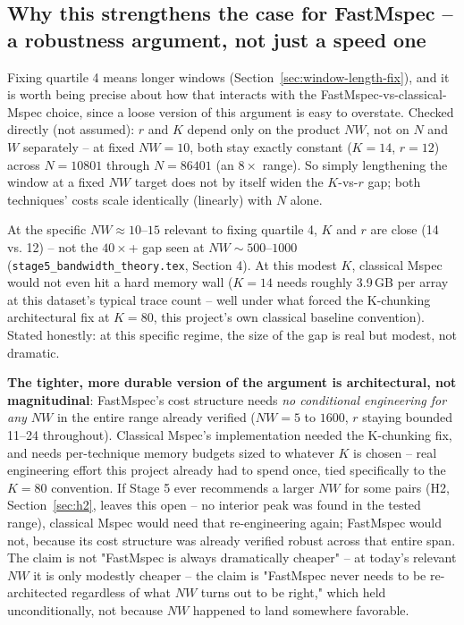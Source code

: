 \documentclass[11pt]{article}
\begin{document}
\subsection{Why this strengthens the case for FastMspec -- a robustness argument, not just a
speed one}
\label{sec:fastmspec-robustness}

Fixing quartile 4 means longer windows (Section~\ref{sec:window-length-fix}), and it is worth
being precise about how that interacts with the FastMspec-vs-classical-Mspec choice, since a
loose version of this argument is easy to overstate. Checked directly (not assumed): $r$ and $K$
depend only on the product $NW$, not on $N$ and $W$ separately -- at fixed $NW=10$, both stay
exactly constant ($K=14$, $r=12$) across $N=10801$ through $N=86401$ (an $8\times$ range). So
simply lengthening the window at a fixed $NW$ target does not by itself widen the $K$-vs-$r$ gap;
both techniques' costs scale identically (linearly) with $N$ alone.

At the specific $NW\approx10$--$15$ relevant to fixing quartile 4, $K$ and $r$ are close (14 vs.
12) -- not the $40\times$+ gap seen at $NW\sim500$--$1000$ (\texttt{stage5\_bandwidth\_theory.tex},
Section 4). At this modest $K$, classical Mspec would not even hit a
hard memory wall ($K=14$ needs roughly 3.9\,GB per array at this dataset's typical trace count --
well under what forced the K-chunking architectural fix at $K=80$, this project's own classical
baseline convention). Stated honestly: at this specific regime, the size of the gap is real but
modest, not dramatic.

\textbf{The tighter, more durable version of the argument is architectural, not magnitudinal}:
FastMspec's cost structure needs \emph{no conditional engineering for any $NW$} in the entire
range already verified ($NW=5$ to $1600$, $r$ staying bounded 11--24 throughout). Classical
Mspec's implementation needed the K-chunking fix, and needs per-technique memory budgets sized to
whatever $K$ is chosen -- real engineering effort this project already had to spend once, tied
specifically to the $K=80$ convention. If Stage 5 ever recommends a larger $NW$ for some pairs
(H2, Section~\ref{sec:h2}, leaves this open -- no interior peak was found in the tested range),
classical Mspec would need that re-engineering again; FastMspec would not, because its cost
structure was already verified robust across that entire span. The claim is not "FastMspec is
always dramatically cheaper" -- at today's relevant $NW$ it is only modestly cheaper -- the claim
is "FastMspec never needs to be re-architected regardless of what $NW$ turns out to be right,"
which held unconditionally, not because $NW$ happened to land somewhere favorable.
\end{document}
